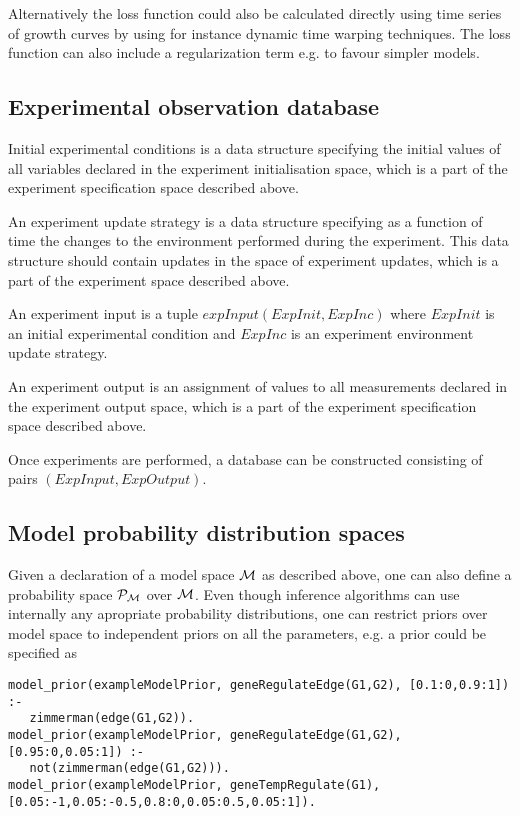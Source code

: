 \documentclass{article}
\begin{document}
Alternatively the loss function could also be calculated directly using time series of growth curves by using for instance 
dynamic time warping techniques. The loss function can also include a regularization term e.g. to favour simpler models.

\subsection{Experimental observation database}

Initial experimental conditions is a data structure specifying the initial values of all variables declared in the experiment initialisation space, which is a part of the experiment specification space described above.

An experiment update strategy is a data structure specifying as a function of time the changes to the environment performed during the experiment.  This data structure should contain updates in the space of experiment updates, which is a part of the experiment space described above.

An experiment input is a tuple $expInput(ExpInit,ExpInc)$
where $ExpInit$ is an initial experimental condition
and $ExpInc$ is an experiment environment update strategy.

An experiment output is an assignment of values to all measurements declared in the experiment output space, which is a part of the experiment specification space described above.

Once experiments are performed, a database can be constructed consisting of
pairs $(ExpInput,ExpOutput)$.

\subsection{Model probability distribution spaces}
\label{sec:modProbDist}
Given a declaration of a model space $\mathcal{M}$ as described above, one can also define a probability space $\mathcal{P}_\mathcal{M}$ over $\mathcal{M}$.
Even though inference algorithms can use internally any apropriate
probability distributions, one can restrict priors over model space
to independent priors on all the parameters, e.g. a prior could be specified as

\begin{verbatim}
model_prior(exampleModelPrior, geneRegulateEdge(G1,G2), [0.1:0,0.9:1]) :- 
   zimmerman(edge(G1,G2)).
model_prior(exampleModelPrior, geneRegulateEdge(G1,G2), [0.95:0,0.05:1]) :- 
   not(zimmerman(edge(G1,G2))).
model_prior(exampleModelPrior, geneTempRegulate(G1), [0.05:-1,0.05:-0.5,0.8:0,0.05:0.5,0.05:1]).
\end{verbatim}
\end{document}

